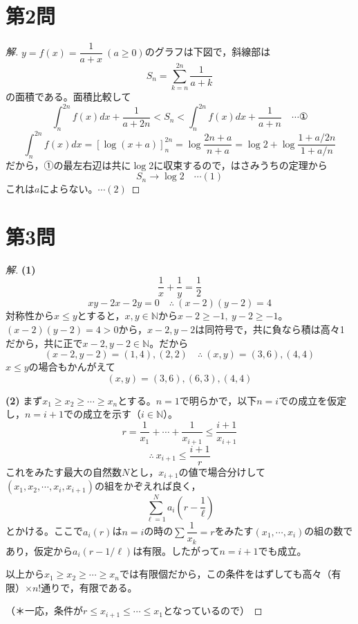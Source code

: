 \documentclass[../main.tex]{subfiles}
\begin{document}
\newpage

\section*{第2問}

\begin{proof}[解]
  $y=f(x)=\dfrac{1}{a+x}\ (a\ge0)$のグラフは下図で，斜線部は
  \[
    S_n=\sum_{k=n}^{2n}\frac{1}{a+k}
  \]
  の面積である。面積比較して
  \[
    \int_n^{2n}f(x)dx+\frac{1}{a+2n}<S_n<\int_n^{2n}f(x)dx+\frac{1}{a+n} \quad\cdots\text{①}
  \]
  \[
    \int_n^{2n}f(x)dx=\left[\log(x+a)\right]_n^{2n}=\log\frac{2n+a}{n+a}=\log2+\log\frac{1+a/2n}{1+a/n}
  \]
  だから，①の最左右辺は共に$\log2$に収束するので，はさみうちの定理から
  \[
    S_n\longrightarrow\log2 \quad\cdots(1)
  \]
  これは$a$によらない。$\cdots(2)$
\end{proof}

\newpage

\section*{第3問}

\begin{proof}[解]
  \textbf{(1)}
  \[
    \frac1x+\frac1y=\frac12
  \]
  \[
    xy-2x-2y=0 \quad\therefore\ (x-2)(y-2)=4
  \]
  対称性から$x\le y$とすると，$x,y\in\mathbb{N}$から$x-2\ge-1,\ y-2\ge-1$。$(x-2)(y-2)=4>0$から，$x-2,y-2$は同符号で，共に負なら積は高々1だから，共に正で$x-2,y-2\in\mathbb{N}$。だから
  \[
    (x-2,y-2)=(1,4),(2,2) \quad\therefore\ (x,y)=(3,6),(4,4)
  \]
  $x\le y$の場合もかんがえて
  \[
    (x,y)=(3,6),(6,3),(4,4)
  \]

  \textbf{(2)} まず$x_1\ge x_2\ge\cdots\ge x_n$とする。$n=1$で明らかで，以下$n=i$での成立を仮定し，$n=i+1$での成立を示す（$i\in\mathbb{N}$）。
  \[
    r=\frac1{x_1}+\cdots+\frac1{x_{i+1}}\le\frac{i+1}{x_{i+1}}
  \]
  \[
    \therefore\ x_{i+1}\le\frac{i+1}{r}
  \]
  これをみたす最大の自然数$N$とし，$x_{i+1}$の値で場合分けして$(x_1,x_2,\cdots,x_i,x_{i+1})$の組をかぞえれば良く，
  \[
    \sum_{\ell=1}^Na_i\left(r-\frac1\ell\right)
  \]
  とかける。ここで$a_i(r)$は$n=i$の時の$\sum\dfrac1{x_k}=r$をみたす$(x_1,\cdots,x_i)$の組の数であり，仮定から$a_i(r-1/\ell)$は有限。したがって$n=i+1$でも成立。

  以上から$x_1\ge x_2\ge\cdots\ge x_n$では有限個だから，この条件をはずしても高々（有限）$\times n!$通りで，有限である。

  （＊一応，条件が$r\le x_{i+1}\le\cdots\le x_1$となっているので）
\end{proof}
\end{document}

